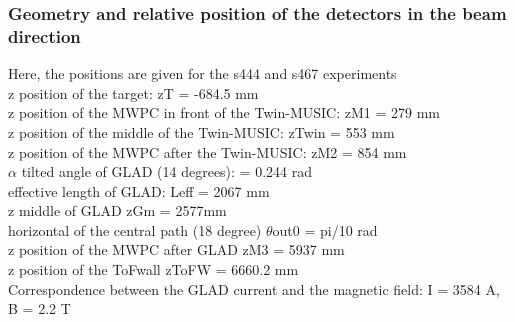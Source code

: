 \documentclass[12pt, letterpaper]{article}
\begin{document}
\subsubsection{Geometry and relative position of the detectors in the beam direction}
Here, the positions are given for the s444 and s467 experiments\\
z position of the target:    \hspace{10mm} zT = -684.5 mm\\
z position of the MWPC in front of the Twin-MUSIC:  \hspace{10mm}   zM1 = 279 mm \\
z position of the middle of the Twin-MUSIC:  \hspace{10mm}  zTwin = 553 mm\\
z position of the MWPC after the Twin-MUSIC:  \hspace{10mm}   zM2 = 854 mm\\
$\alpha$ tilted angle of GLAD (14 degrees):   \hspace{10mm} = 0.244 rad\\
effective length of GLAD:  \hspace{10mm}   Leff = 2067 mm\\
z middle of GLAD  \hspace{10mm}  zGm = 2577mm\\
horizontal of the central path (18 degree) \hspace{10mm}   $\theta$\textunderscore out0 = pi/10 rad\\
z position of the MWPC after GLAD   \hspace{10mm}  zM3 = 5937 mm\\
z position of the ToFwall          \hspace{10mm}     zToFW = 6660.2 mm\\

Correspondence between the GLAD current and the magnetic field:  I = 3584 A, B = 2.2 T
\end{document}
